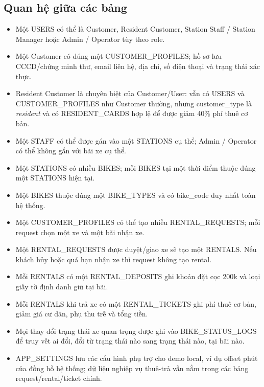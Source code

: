 \subsection{Quan hệ giữa các bảng}
\begin{itemize}
  \item Một USERS có thể là Customer, Resident Customer, Station Staff / Station Manager hoặc Admin / Operator tùy theo role.
  \item Một Customer có đúng một CUSTOMER\_PROFILES; hồ sơ lưu CCCD/chứng minh thư, email liên hệ, địa chỉ, số điện thoại và trạng thái xác thực.
  \item Resident Customer là chuyên biệt của Customer/User: vẫn có USERS và CUSTOMER\_PROFILES như Customer thường, nhưng customer\_type là \textit{resident} và có RESIDENT\_CARDS hợp lệ để được giảm 40\% phí thuê cơ bản.
  \item Một STAFF có thể được gán vào một STATIONS cụ thể; Admin / Operator có thể không gắn với bãi xe cụ thể.
  \item Một STATIONS có nhiều BIKES; mỗi BIKES tại một thời điểm thuộc đúng một STATIONS hiện tại.
  \item Một BIKES thuộc đúng một BIKE\_TYPES và có bike\_code duy nhất toàn hệ thống.
  \item Một CUSTOMER\_PROFILES có thể tạo nhiều RENTAL\_REQUESTS; mỗi request chọn một xe và một bãi nhận xe.
  \item Một RENTAL\_REQUESTS được duyệt/giao xe sẽ tạo một RENTALS. Nếu khách hủy hoặc quá hạn nhận xe thì request không tạo rental.
  \item Mỗi RENTALS có một RENTAL\_DEPOSITS ghi khoản đặt cọc 200k và loại giấy tờ định danh giữ tại bãi.
  \item Mỗi RENTALS khi trả xe có một RENTAL\_TICKETS ghi phí thuê cơ bản, giảm giá cư dân, phụ thu trễ và tổng tiền.
  \item Mọi thay đổi trạng thái xe quan trọng được ghi vào BIKE\_STATUS\_LOGS để truy vết ai đổi, đổi từ trạng thái nào sang trạng thái nào, tại bãi nào.
  \item APP\_SETTINGS lưu các cấu hình phụ trợ cho demo local, ví dụ offset phút của đồng hồ hệ thống; dữ liệu nghiệp vụ thuê-trả vẫn nằm trong các bảng request/rental/ticket chính.
\end{itemize}

